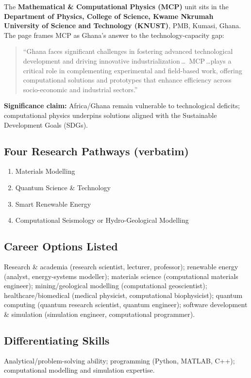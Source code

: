 \documentclass[11pt,a4paper]{article}
\begin{document}
The \textbf{Mathematical \& Computational Physics (MCP)} unit sits in the \textbf{Department of Physics, College of Science, Kwame Nkrumah University of Science and Technology (KNUST)}, PMB, Kumasi, Ghana. The page frames MCP as Ghana's answer to the technology-capacity gap:

\begin{quote}
``Ghana faces significant challenges in fostering advanced technological development and driving innovative industrialization\,\ldots\ MCP\,\ldots plays a critical role in complementing experimental and field-based work, offering computational solutions and prototypes that enhance efficiency across socio-economic and industrial sectors.''
\end{quote}

\textbf{Significance claim:} Africa/Ghana remain vulnerable to technological deficits; computational physics underpins solutions aligned with the Sustainable Development Goals (SDGs).

\subsection*{Four Research Pathways (verbatim)}
\begin{enumerate}[leftmargin=1.8em]
  \item Materials Modelling
  \item Quantum Science \& Technology
  \item Smart Renewable Energy
  \item Computational Seismology or Hydro-Geological Modelling
\end{enumerate}

\subsection*{Career Options Listed}
Research \& academia (research scientist, lecturer, professor); renewable energy (analyst, energy-systems modeller); materials science (computational materials engineer); mining/geological modelling (computational geoscientist); healthcare/biomedical (medical physicist, computational biophysicist); quantum computing (quantum research scientist, quantum engineer); software development \& simulation (simulation engineer, computational programmer).

\subsection*{Differentiating Skills}
Analytical/problem-solving ability; programming (Python, MATLAB, C++); computational modelling and simulation expertise.
\end{document}
